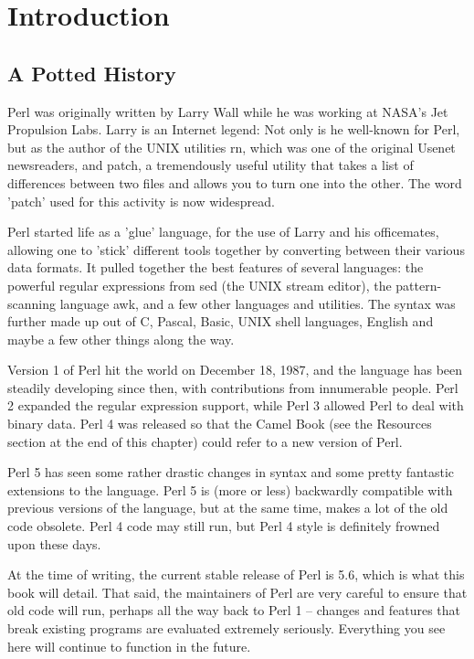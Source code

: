 \documentclass[a4paper,11pt]{book}
\begin{document}
\chapter[short]{Introduction}

\section[short]{A Potted History}

Perl was originally written by Larry Wall while he was working at NASA's Jet Propulsion Labs. Larry is an Internet legend: Not only is he well-known for Perl, but as the author of the UNIX utilities rn, which was one of the original Usenet newsreaders, and patch, a tremendously useful utility that takes a list of differences between two files and allows you to turn one into the other. The word 'patch' used for this activity is now widespread.

Perl started life as a 'glue' language, for the use of Larry and his officemates, allowing one to 'stick' different tools together by converting between their various data formats. It pulled together the best features of several languages: the powerful regular expressions from sed (the UNIX stream editor), the pattern-scanning language awk, and a few other languages and utilities. The syntax was further made up out of C, Pascal, Basic, UNIX shell languages, English and maybe a few other things along the way.

Version 1 of Perl hit the world on December 18, 1987, and the language has been steadily developing since then, with contributions from innumerable people. Perl 2 expanded the regular expression support, while Perl 3 allowed Perl to deal with binary data. Perl 4 was released so that the Camel Book (see the Resources section at the end of this chapter) could refer to a new version of Perl.

Perl 5 has seen some rather drastic changes in syntax and some pretty fantastic extensions to the language. Perl 5 is (more or less) backwardly compatible with previous versions of the language, but at the same time, makes a lot of the old code obsolete. Perl 4 code may still run, but Perl 4 style is definitely frowned upon these days.

At the time of writing, the current stable release of Perl is 5.6, which is what this book will detail. That said, the maintainers of Perl are very careful to ensure that old code will run, perhaps all the way back to Perl 1 -- changes and features that break existing programs are evaluated extremely seriously. Everything you see here will continue to function in the future.
\end{document}
